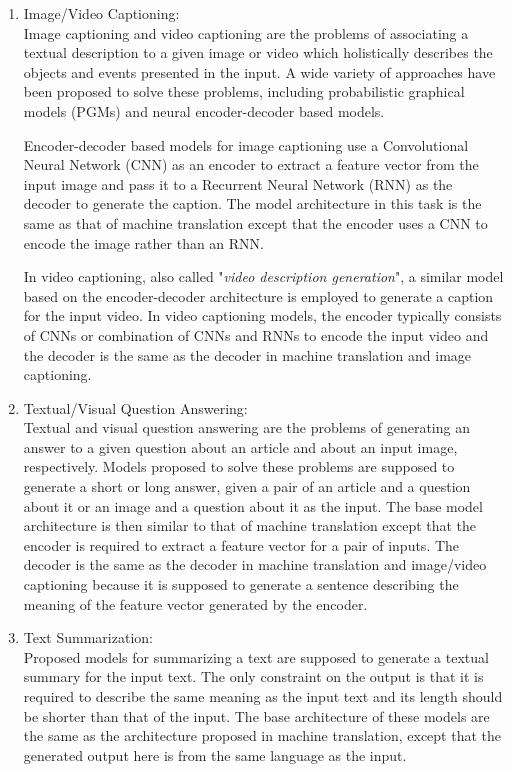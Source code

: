 \documentclass[preprint, 12pt]{elsarticle}
\begin{document}
\begin{enumerate}
		\item Image/Video Captioning:\\
		Image captioning and video captioning are the problems of associating a textual description to a given image or video which holistically describes the objects and events presented in the input. A wide variety of approaches have been proposed to solve these problems, including probabilistic graphical models (PGMs) and neural encoder-decoder based models.
		
		Encoder-decoder based models for image captioning use a Convolutional Neural Network (CNN) as an encoder to extract a feature vector from the input image and pass it to a Recurrent Neural Network (RNN) as the decoder to generate the caption. The model architecture in this task is the same as that of machine translation except that the encoder uses a CNN to encode the image rather than an RNN.
		
		In video captioning, also called "\textit{video description generation}", a similar model based on the encoder-decoder architecture is employed to generate a caption for the input video. In video captioning models, the encoder typically consists of CNNs or combination of CNNs and RNNs to encode the input video and the decoder is the same as the decoder in machine translation and image captioning. 
		
		
		\item Textual/Visual Question Answering:\\
		Textual and visual question answering are the problems of generating an answer to a given question about an article and about an input image, respectively. Models proposed to solve these problems are supposed to generate a short or long answer, given a pair of an article and a question about it or an image and a question about it as the input. The base model architecture is then similar to that of machine translation except that the encoder is required to extract a feature vector for a pair of inputs. The decoder is the same as the decoder in machine translation and image/video captioning because it is supposed to generate a sentence describing the meaning of the feature vector generated by the encoder.
		
		\item Text Summarization:\\
		Proposed models for summarizing a text are supposed to generate a textual summary for the input text. The only constraint on the output is that it is required to describe the same meaning as the input text and its length should be shorter than that of the input. The base architecture of these models are the same as the architecture proposed in machine translation, except that the generated output here is from the same language as the input. 
		
	\end{enumerate}
	
\end{document}
